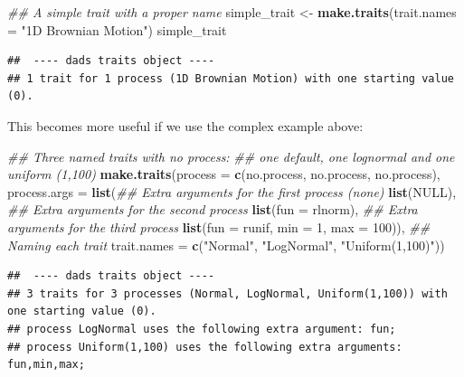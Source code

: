 \documentclass[]{book}
\newenvironment{Shaded}{\begin{snugshade}}{\end{snugshade}}
\newcommand{\CommentTok}[1]{\textcolor[rgb]{0.56,0.35,0.01}{\textit{#1}}}
\newcommand{\DataTypeTok}[1]{\textcolor[rgb]{0.13,0.29,0.53}{#1}}
\newcommand{\DecValTok}[1]{\textcolor[rgb]{0.00,0.00,0.81}{#1}}
\newcommand{\KeywordTok}[1]{\textcolor[rgb]{0.13,0.29,0.53}{\textbf{#1}}}
\newcommand{\NormalTok}[1]{#1}
\newcommand{\OtherTok}[1]{\textcolor[rgb]{0.56,0.35,0.01}{#1}}
\newcommand{\StringTok}[1]{\textcolor[rgb]{0.31,0.60,0.02}{#1}}
\begin{document}
\begin{Shaded}
\begin{Highlighting}[]
\CommentTok{## A simple trait with a proper name}
\NormalTok{simple_trait <-}\StringTok{ }\KeywordTok{make.traits}\NormalTok{(}\DataTypeTok{trait.names =} \StringTok{"1D Brownian Motion"}\NormalTok{)}
\NormalTok{simple_trait}
\end{Highlighting}
\end{Shaded}

\begin{verbatim}
##  ---- dads traits object ---- 
## 1 trait for 1 process (1D Brownian Motion) with one starting value (0).
\end{verbatim}

This becomes more useful if we use the complex example above:

\begin{Shaded}
\begin{Highlighting}[]
\CommentTok{## Three named traits with no process:}
\CommentTok{## one default, one lognormal and one uniform (1,100)}
\KeywordTok{make.traits}\NormalTok{(}\DataTypeTok{process      =} \KeywordTok{c}\NormalTok{(no.process, no.process, no.process),}
            \DataTypeTok{process.args =} \KeywordTok{list}\NormalTok{(}\CommentTok{## Extra arguments for the first process (none)}
                                \KeywordTok{list}\NormalTok{(}\OtherTok{NULL}\NormalTok{),}
                                \CommentTok{## Extra arguments for the second process}
                                \KeywordTok{list}\NormalTok{(}\DataTypeTok{fun =}\NormalTok{ rlnorm),}
                                \CommentTok{## Extra arguments for the third process}
                                \KeywordTok{list}\NormalTok{(}\DataTypeTok{fun =}\NormalTok{ runif, }\DataTypeTok{min =} \DecValTok{1}\NormalTok{, }\DataTypeTok{max =} \DecValTok{100}\NormalTok{)),}
            \CommentTok{## Naming each trait}
            \DataTypeTok{trait.names  =} \KeywordTok{c}\NormalTok{(}\StringTok{"Normal"}\NormalTok{, }\StringTok{"LogNormal"}\NormalTok{, }\StringTok{"Uniform(1,100)"}\NormalTok{))}
\end{Highlighting}
\end{Shaded}

\begin{verbatim}
##  ---- dads traits object ---- 
## 3 traits for 3 processes (Normal, LogNormal, Uniform(1,100)) with one starting value (0).
## process LogNormal uses the following extra argument: fun;
## process Uniform(1,100) uses the following extra arguments: fun,min,max;
\end{verbatim}
\end{document}
